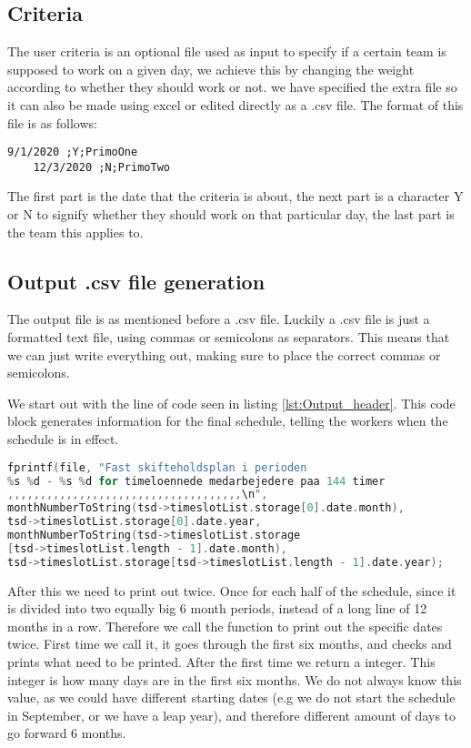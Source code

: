 \subsection{Criteria}
The user criteria is an optional file used as input to specify if a certain team is supposed to work on a given day, we achieve this by changing the weight according to whether they should work or not. we have specified the extra file so it can also be made using excel or edited directly as a .csv file. The format of this file is as follows:
\begin{lstlisting}[caption={Example Criteria.}]
    9/1/2020 ;Y;PrimoOne
    12/3/2020 ;N;PrimoTwo
\end{lstlisting}
The first part is the date that the criteria is about, the next part is a character Y or N to signify whether they should work on that particular day, the last part is the team this applies to.

\subsection{Output .csv file generation}

The output file is as mentioned before a .csv file. Luckily a .csv file is just a formatted text file, using commas or semicolons as separators. This means that we can just write everything out, making sure to place the correct commas or semicolons. 

We start out with the line of code seen in listing \ref{lst:Output_header}. This code block generates information for the final schedule, telling the workers when the schedule is in effect.

\begin{lstlisting}[caption={Writing of header},label={lst:Output_header},language=C]
fprintf(file, "Fast skifteholdsplan i perioden 
%s %d - %s %d for timeloennede medarbejedere paa 144 timer
,,,,,,,,,,,,,,,,,,,,,,,,,,,,,,,,,,,,\n",
monthNumberToString(tsd->timeslotList.storage[0].date.month),
tsd->timeslotList.storage[0].date.year,
monthNumberToString(tsd->timeslotList.storage
[tsd->timeslotList.length - 1].date.month),
tsd->timeslotList.storage[tsd->timeslotList.length - 1].date.year);
\end{lstlisting}

After this we need to print out twice. Once for each half of the schedule, since it is divided into two equally big 6 month periods, instead of a long line of 12 months in a row. Therefore we call the function to print out the specific dates twice. First time we call it, it goes through the first six months, and checks and prints what need to be printed. After the first time we return a integer. This integer is how many days are in the first six months. We do not always know this value, as we could have different starting dates (e.g we do not start the schedule in September, or we have a leap year), and therefore different amount of days to go forward 6 months. 

